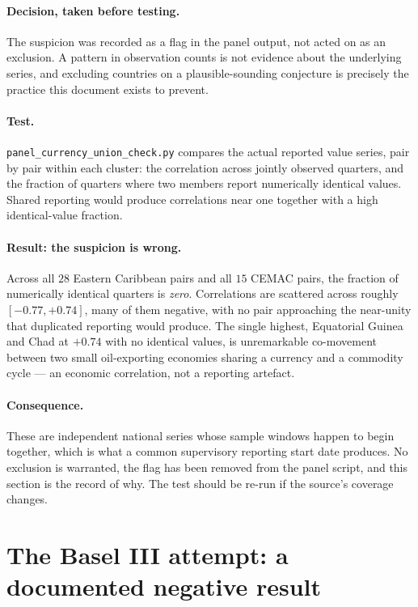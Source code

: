 \documentclass[11pt]{article}
\begin{document}
\paragraph{Decision, taken before testing.} The suspicion was recorded as
a flag in the panel output, not acted on as an exclusion. A pattern in
observation counts is not evidence about the underlying series, and
excluding countries on a plausible-sounding conjecture is precisely the
practice this document exists to prevent.

\paragraph{Test.} \texttt{panel\_currency\_union\_check.py} compares the
actual reported value series, pair by pair within each cluster: the
correlation across jointly observed quarters, and the fraction of
quarters where two members report numerically identical values. Shared
reporting would produce correlations near one together with a high
identical-value fraction.

\paragraph{Result: the suspicion is wrong.} Across all $28$ Eastern
Caribbean pairs and all $15$ CEMAC pairs, the fraction of numerically
identical quarters is \emph{zero}. Correlations are scattered across
roughly $[-0.77, +0.74]$, many of them negative, with no pair approaching
the near-unity that duplicated reporting would produce. The single
highest, Equatorial Guinea and Chad at $+0.74$ with no identical values,
is unremarkable co-movement between two small oil-exporting economies
sharing a currency and a commodity cycle --- an economic correlation, not
a reporting artefact.

\paragraph{Consequence.} These are independent national series whose
sample windows happen to begin together, which is what a common
supervisory reporting start date produces. No exclusion is warranted,
the flag has been removed from the panel script, and this section is the
record of why. The test should be re-run if the source's coverage
changes.

\section{The Basel III attempt: a documented negative result}
\label{sec:basel-negative}
\end{document}
